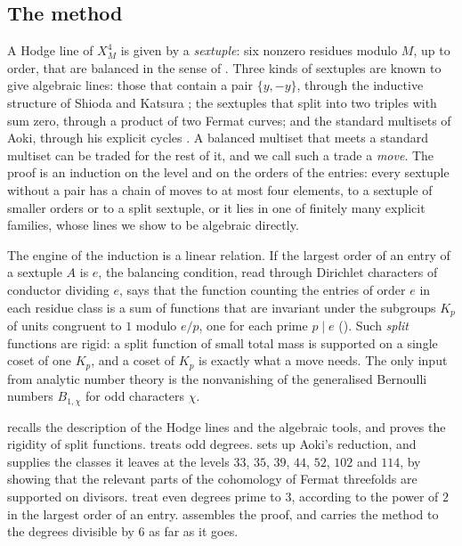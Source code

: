 \subsection*{The method}
A Hodge line of $X^{4}_{M}$ is given by a \emph{sextuple}: six nonzero
residues modulo $M$, up to order, that are balanced in the sense of
. Three kinds of sextuples are known to give algebraic
lines: those that contain a pair $\{y,-y\}$, through the inductive structure
of Shioda and Katsura \cite{SK79}; the sextuples that split into two triples
with sum zero, through a product of two Fermat curves; and the standard
multisets of Aoki, through his explicit cycles \cite{Aok87}. A balanced
multiset that meets a standard multiset can be traded for the rest of it, and
we call such a trade a \emph{move}. The proof is an induction on the level and
on the orders of the entries: every sextuple without a pair has a chain of
moves to at most four elements, to a sextuple of smaller orders or to a split
sextuple, or it lies in one of finitely many explicit families, whose lines
we show to be algebraic directly.

The engine of the induction is a linear relation. If the largest order of an
entry of a sextuple $A$ is $e$, the balancing condition, read through Dirichlet
characters of conductor dividing $e$, says that the function counting the
entries of order $e$ in each residue class is a sum of functions that are
invariant under the subgroups $K_{p}$ of units congruent to $1$ modulo $e/p$,
one for each prime $p\mid e$ (). Such \emph{split}
functions are rigid: a split function of small total mass is supported on a
single coset of one $K_{p}$, and a coset of $K_{p}$ is exactly what a move
needs. The only input from analytic number theory is the nonvanishing of the generalised
Bernoulli numbers $B_{1,\chi}$ for odd characters $\chi$.

 recalls the description of the Hodge lines and the
algebraic tools, and  proves the rigidity of split
functions.  treats odd degrees.  sets up Aoki's
reduction, and  supplies the classes it leaves at the
levels $33$, $35$, $39$, $44$, $52$, $102$ and $114$, by showing that the
relevant parts of the cohomology of Fermat threefolds are supported on
divisors.  treat even degrees prime to $3$, according
to the power of $2$ in the largest order of an entry. 
assembles the proof, and  carries the method to the degrees
divisible by $6$ as far as it goes.
